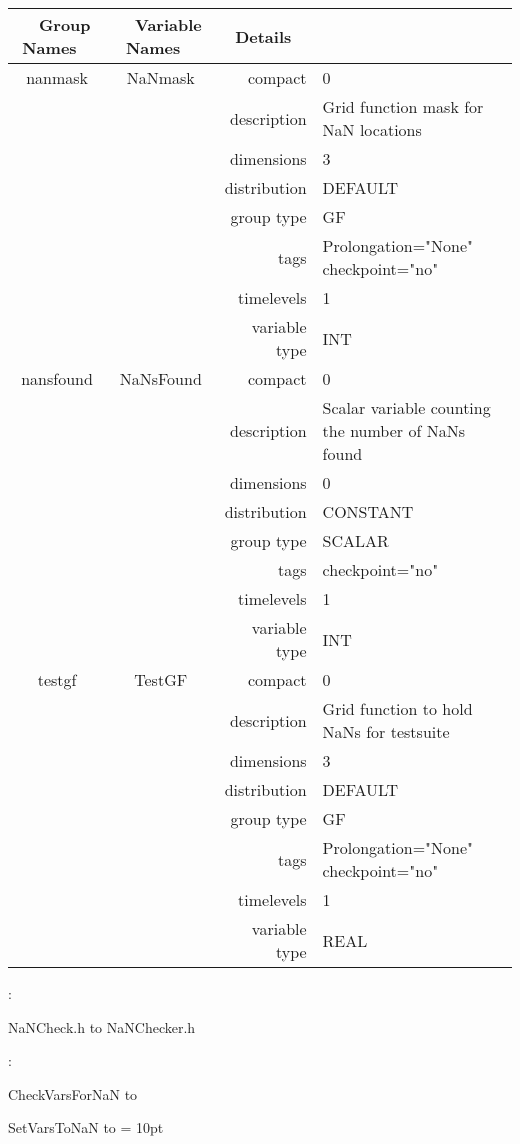 \begin{tabular*}{150mm}{|c|c@{\extracolsep{\fill}}|rl|} \hline 
~ {\bf Group Names} ~ & ~ {\bf Variable Names} ~  &{\bf Details} ~ & ~\\ 
\hline 
nanmask & NaNmask & compact & 0 \\ 
 &  & description & Grid function mask for NaN locations \\ 
 &  & dimensions & 3 \\ 
 &  & distribution & DEFAULT \\ 
 &  & group type & GF \\ 
 &  & tags & Prolongation="None" checkpoint="no" \\ 
 &  & timelevels & 1 \\ 
 &  & variable type & INT \\ 
\hline 
nansfound & NaNsFound & compact & 0 \\ 
 &  & description & Scalar variable counting the number of NaNs found \\ 
 &  & dimensions & 0 \\ 
 &  & distribution & CONSTANT \\ 
 &  & group type & SCALAR \\ 
 &  & tags & checkpoint="no" \\ 
 &  & timelevels & 1 \\ 
 &  & variable type & INT \\ 
\hline 
testgf & TestGF & compact & 0 \\ 
 &  & description & Grid function to hold NaNs for testsuite \\ 
 &  & dimensions & 3 \\ 
 &  & distribution & DEFAULT \\ 
 &  & group type & GF \\ 
 &  & tags & Prolongation="None" checkpoint="no" \\ 
 &  & timelevels & 1 \\ 
 &  & variable type & REAL \\ 
\hline 
\end{tabular*} 



\vspace{5mm}

: 



NaNCheck.h to NaNChecker.h
\vspace{2mm}

: 



CheckVarsForNaN to 

SetVarsToNaN to 
\vspace{2mm}\parskip = 10pt 
